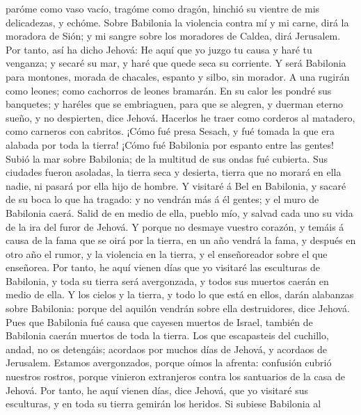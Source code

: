 paróme como vaso vacío, tragóme como dragón, hinchió su vientre de mis
delicadezas, y echóme.  Sobre Babilonia la violencia
contra mí y mi carne, dirá la moradora de Sión; y mi sangre sobre los
moradores de Caldea, dirá Jerusalem.  Por tanto, así ha
dicho Jehová: He aquí que yo juzgo tu causa y haré tu venganza; y secaré
su mar, y haré que quede seca su corriente.  Y será
Babilonia para montones, morada de chacales, espanto y silbo, sin
morador.  A una rugirán como leones; como cachorros de
leones bramarán.  En su calor les pondré sus banquetes; y
haréles que se embriaguen, para que se alegren, y duerman eterno sueño,
y no despierten, dice Jehová.  Hacerlos he traer como
corderos al matadero, como carneros con cabritos.  ¡Cómo
fué presa Sesach, y fué tomada la que era alabada por toda la tierra!
¡Cómo fué Babilonia por espanto entre las gentes!  Subió
la mar sobre Babilonia; de la multitud de sus ondas fué cubierta.
 Sus ciudades fueron asoladas, la tierra seca y desierta,
tierra que no morará en ella nadie, ni pasará por ella hijo de hombre.
 Y visitaré á Bel en Babilonia, y sacaré de su boca lo
que ha tragado: y no vendrán más á él gentes; y el muro de Babilonia
caerá.  Salid de en medio de ella, pueblo mío, y salvad
cada uno su vida de la ira del furor de Jehová.  Y porque
no desmaye vuestro corazón, y temáis á causa de la fama que se oirá por
la tierra, en un año vendrá la fama, y después en otro año el rumor, y
la violencia en la tierra, y el enseñoreador sobre el que enseñorea.
 Por tanto, he aquí vienen días que yo visitaré las
esculturas de Babilonia, y toda su tierra será avergonzada, y todos sus
muertos caerán en medio de ella.  Y los cielos y la
tierra, y todo lo que está en ellos, darán alabanzas sobre Babilonia:
porque del aquilón vendrán sobre ella destruidores, dice Jehová.
 Pues que Babilonia fué causa que cayesen muertos de
Israel, también de Babilonia caerán muertos de toda la tierra.
 Los que escapasteis del cuchillo, andad, no os
detengáis; acordaos por muchos días de Jehová, y acordaos de Jerusalem.
 Estamos avergonzados, porque oímos la afrenta: confusión
cubrió nuestros rostros, porque vinieron extranjeros contra los
santuarios de la casa de Jehová.  Por tanto, he aquí
vienen días, dice Jehová, que yo visitaré sus esculturas, y en toda su
tierra gemirán los heridos.  Si subiese Babilonia al
